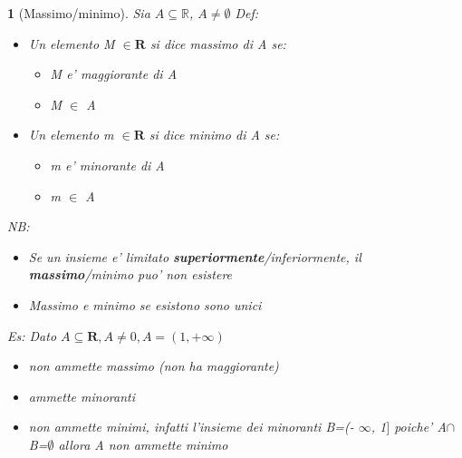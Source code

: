 \documentclass{article}
\theoremstyle{mystyle}
\newtheorem*{mydefinition}{}
\begin{document}
 \begin{mydefinition}[Massimo/minimo]
      Sia $A\subseteq \mathds{R}$, $A\neq \emptyset$ \newline Def: \begin{itemize}
          \item Un elemento M $\in \mathbf{R}$ si dice massimo di A se: \begin{itemize}
              \item M e' maggiorante di A
              \item M $\in$ A
          \end{itemize}
           \item Un elemento m $\in \mathbf{R}$ si dice minimo di A se: \begin{itemize}
              \item m e' minorante di A
              \item m $\in$ A
          \end{itemize}
      \end{itemize}
     \emph{NB}: \begin{itemize}
         \item Se un insieme e' limitato \textbf{superiormente}/\textit{inferiormente}, il \textbf{massimo}/\textit{minimo} puo' non esistere
         \item Massimo e minimo se esistono sono unici
     \end{itemize}
     Es: \newline
     Dato $A \subseteq \mathbf{R}, A\neq 0, A=(1,+\infty)$
     \begin{itemize}
         \item non ammette massimo (non ha maggiorante)
         \item ammette minoranti
         \item non ammette minimi, infatti l'insieme dei minoranti B=(- $\infty$, 1$]$ poiche' A$\cap$B=$\emptyset$ allora A non ammette minimo
     \end{itemize}
 \end{mydefinition}
\end{document}
